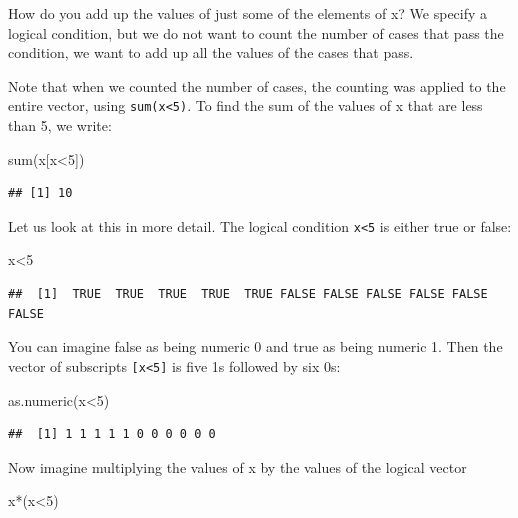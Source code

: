 \documentclass[
]{book}
\newenvironment{Shaded}{\begin{snugshade}}{\end{snugshade}}
\newcommand{\DecValTok}[1]{\textcolor[rgb]{0.00,0.00,0.81}{#1}}
\newcommand{\FunctionTok}[1]{\textcolor[rgb]{0.00,0.00,0.00}{#1}}
\newcommand{\NormalTok}[1]{#1}
\newcommand{\SpecialCharTok}[1]{\textcolor[rgb]{0.00,0.00,0.00}{#1}}
\begin{document}
How do you add up the values of just some of the elements of x? We specify a logical condition, but we do not want to count the number of cases that pass the condition, we want to add up all the values of the cases that pass.

Note that when we counted the number of cases, the counting was applied to the entire vector, using \texttt{sum(x\textless{}5)}. To find the sum of the values of x that are less than 5, we write:

\begin{Shaded}
\begin{Highlighting}[]
\FunctionTok{sum}\NormalTok{(x[x}\SpecialCharTok{\textless{}}\DecValTok{5}\NormalTok{])}
\end{Highlighting}
\end{Shaded}

\begin{verbatim}
## [1] 10
\end{verbatim}

Let us look at this in more detail. The logical condition \texttt{x\textless{}5} is either true or false:

\begin{Shaded}
\begin{Highlighting}[]
\NormalTok{x}\SpecialCharTok{\textless{}}\DecValTok{5}
\end{Highlighting}
\end{Shaded}

\begin{verbatim}
##  [1]  TRUE  TRUE  TRUE  TRUE  TRUE FALSE FALSE FALSE FALSE FALSE FALSE
\end{verbatim}

You can imagine false as being numeric 0 and true as being numeric 1. Then the vector of subscripts \texttt{{[}x\textless{}5{]}} is five 1s followed by six 0s:

\begin{Shaded}
\begin{Highlighting}[]
\FunctionTok{as.numeric}\NormalTok{(x}\SpecialCharTok{\textless{}}\DecValTok{5}\NormalTok{)}
\end{Highlighting}
\end{Shaded}

\begin{verbatim}
##  [1] 1 1 1 1 1 0 0 0 0 0 0
\end{verbatim}

Now imagine multiplying the values of x by the values of the logical vector

\begin{Shaded}
\begin{Highlighting}[]
\NormalTok{x}\SpecialCharTok{*}\NormalTok{(x}\SpecialCharTok{\textless{}}\DecValTok{5}\NormalTok{)}
\end{Highlighting}
\end{Shaded}
\end{document}
